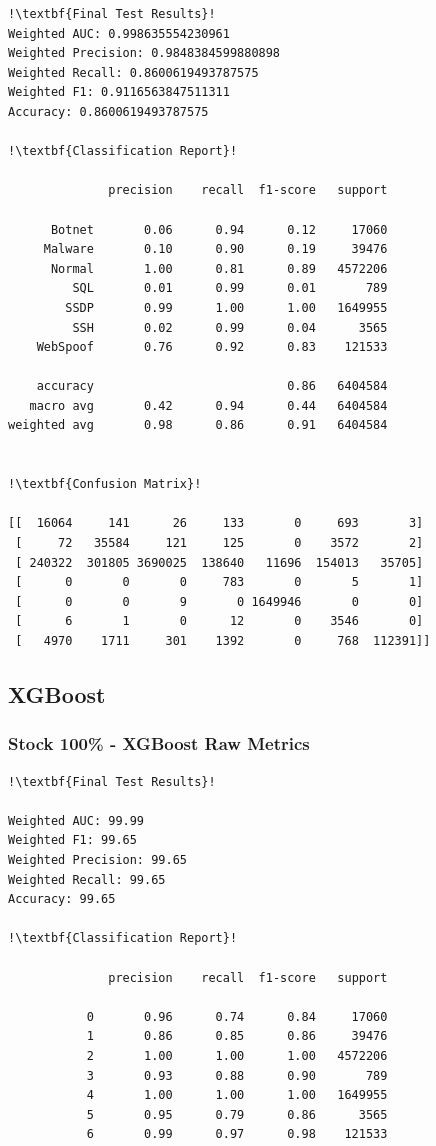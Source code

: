 \begin{appendices}
\begin{lstlisting}[escapechar=!]
!\textbf{Final Test Results}!
Weighted AUC: 0.998635554230961
Weighted Precision: 0.9848384599880898
Weighted Recall: 0.8600619493787575
Weighted F1: 0.9116563847511311
Accuracy: 0.8600619493787575

!\textbf{Classification Report}!

			  precision    recall  f1-score   support

      Botnet       0.06      0.94      0.12     17060
     Malware       0.10      0.90      0.19     39476
      Normal       1.00      0.81      0.89   4572206
         SQL       0.01      0.99      0.01       789
        SSDP       0.99      1.00      1.00   1649955
         SSH       0.02      0.99      0.04      3565
    WebSpoof       0.76      0.92      0.83    121533

    accuracy                           0.86   6404584
   macro avg       0.42      0.94      0.44   6404584
weighted avg       0.98      0.86      0.91   6404584
    
    
!\textbf{Confusion Matrix}!

[[  16064     141      26     133       0     693       3]
 [     72   35584     121     125       0    3572       2]
 [ 240322  301805 3690025  138640   11696  154013   35705]
 [      0       0       0     783       0       5       1]
 [      0       0       9       0 1649946       0       0]
 [      6       1       0      12       0    3546       0]
 [   4970    1711     301    1392       0     768  112391]]
\end{lstlisting}


\newpage
\subsection{XGBoost}
\label{appx:XGBoost}

\subsubsection{Stock 100\% - XGBoost Raw Metrics}
\begin{lstlisting}[escapechar=!]
!\textbf{Final Test Results}!

Weighted AUC: 99.99
Weighted F1: 99.65
Weighted Precision: 99.65
Weighted Recall: 99.65
Accuracy: 99.65

!\textbf{Classification Report}!

              precision    recall  f1-score   support

           0       0.96      0.74      0.84     17060
           1       0.86      0.85      0.86     39476
           2       1.00      1.00      1.00   4572206
           3       0.93      0.88      0.90       789
           4       1.00      1.00      1.00   1649955
           5       0.95      0.79      0.86      3565
           6       0.99      0.97      0.98    121533


\end{lstlisting}
\end{appendices}
